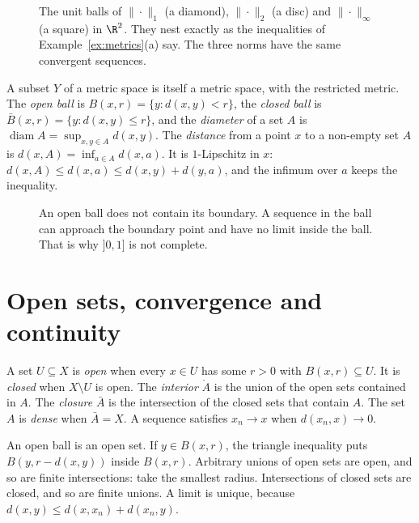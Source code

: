 \begin{figure}[ht]
\centering
{}
\caption{The unit balls of $\|\cdot\|_1$ (a diamond), $\|\cdot\|_2$ (a disc) and $\|\cdot\|_\infty$ (a square) in $\R^2$. They nest exactly as the inequalities of Example~\ref{ex:metrics}(a) say. The three norms have the same convergent sequences.}
\label{fig:balls}
\end{figure}

A subset $Y$ of a metric space is itself a metric space, with the restricted metric. The \emph{open ball} is $B(x,r)=\{y:d(x,y)<r\}$, the \emph{closed ball} is $\bar B(x,r)=\{y:d(x,y)\le r\}$, and the \emph{diameter} of a set $A$ is $\operatorname{diam}A=\sup_{x,y\in A}d(x,y)$. The \emph{distance} from a point $x$ to a non-empty set $A$ is $d(x,A)=\inf_{a\in A}d(x,a)$. It is $1$-Lipschitz in $x$: $d(x,A)\le d(x,a)\le d(x,y)+d(y,a)$, and the infimum over $a$ keeps the inequality.

\begin{figure}[ht]
\centering
{}
\caption{An open ball does not contain its boundary. A sequence in the ball can approach the boundary point and have no limit inside the ball. That is why $]0,1]$ is not complete.}
\label{fig:rwopen}
\end{figure}

\section{Open sets, convergence and continuity}

\begin{definition}
A set $U\subseteq X$ is \emph{open} when every $x\in U$ has some $r>0$ with $B(x,r)\subseteq U$. It is \emph{closed} when $X\setminus U$ is open. The \emph{interior} $\mathring A$ is the union of the open sets contained in $A$. The \emph{closure} $\bar A$ is the intersection of the closed sets that contain $A$. The set $A$ is \emph{dense} when $\bar A=X$. A sequence satisfies $x_n\to x$ when $d(x_n,x)\to0$.
\end{definition}

An open ball is an open set. If $y\in B(x,r)$, the triangle inequality puts $B(y,r-d(x,y))$ inside $B(x,r)$. Arbitrary unions of open sets are open, and so are finite intersections: take the smallest radius. Intersections of closed sets are closed, and so are finite unions. A limit is unique, because $d(x,y)\le d(x,x_n)+d(x_n,y)$.

